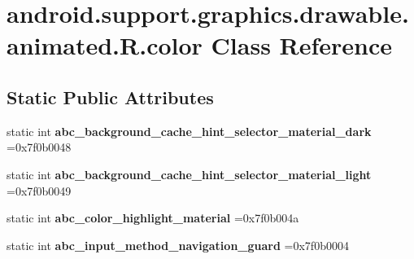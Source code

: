 \hypertarget{classandroid_1_1support_1_1graphics_1_1drawable_1_1animated_1_1R_1_1color}{}\section{android.\+support.\+graphics.\+drawable.\+animated.\+R.\+color Class Reference}
\label{classandroid_1_1support_1_1graphics_1_1drawable_1_1animated_1_1R_1_1color}
\subsection*{Static Public Attributes}
\begin{DoxyCompactItemize}
\item 
\mbox{\label{classandroid_1_1support_1_1graphics_1_1drawable_1_1animated_1_1R_1_1color_a121908cf13f231caf3c9b0bced306ef4}} 
static int {\bfseries abc\+\_\+background\+\_\+cache\+\_\+hint\+\_\+selector\+\_\+material\+\_\+dark} =0x7f0b0048
\item 
\mbox{\label{classandroid_1_1support_1_1graphics_1_1drawable_1_1animated_1_1R_1_1color_ae677f915787cadd535a6c85f7269d4c5}} 
static int {\bfseries abc\+\_\+background\+\_\+cache\+\_\+hint\+\_\+selector\+\_\+material\+\_\+light} =0x7f0b0049
\item 
\mbox{\label{classandroid_1_1support_1_1graphics_1_1drawable_1_1animated_1_1R_1_1color_ac538760af4db8a1540e1eedc1eaa2572}} 
static int {\bfseries abc\+\_\+color\+\_\+highlight\+\_\+material} =0x7f0b004a
\item 
\mbox{\label{classandroid_1_1support_1_1graphics_1_1drawable_1_1animated_1_1R_1_1color_a2d16d9ced1e405c4c49d28ed30000a3c}} 
static int {\bfseries abc\+\_\+input\+\_\+method\+\_\+navigation\+\_\+guard} =0x7f0b0004
\item 
\mbox{\label{classandroid_1_1support_1_1graphics_1_1drawable_1_1animated_1_1R_1_1color_ae9c39343ece9ae78c5337dcb3e053961}} 

\end{DoxyCompactItemize}
